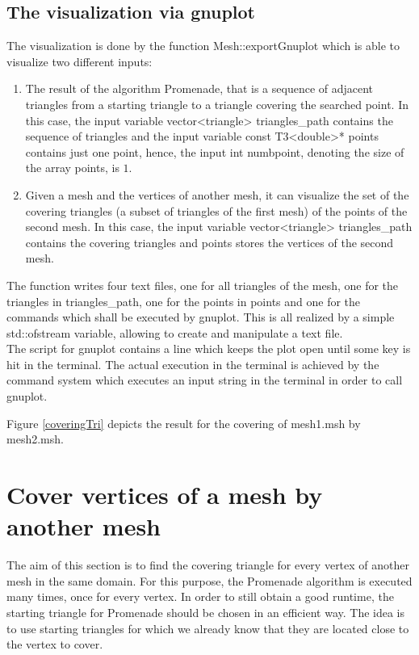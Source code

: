 \documentclass[10pt]{article}
\begin{document}
\subsection{The visualization via gnuplot} \label{visualization}
	The visualization is done by the function {\ttfamily Mesh::exportGnuplot} which is able to visualize two different inputs: 
	\begin{enumerate}
		\item 
		The result of the algorithm Promenade, that is a sequence of adjacent triangles from a starting triangle to a triangle covering the searched point. 
		In this case, the input variable {\ttfamily vector<triangle> triangles\_path} contains the sequence of triangles and the input variable {\ttfamily const T3<double>* points} contains just one point, hence, the input {\ttfamily int numbpoint}, denoting the size of the array {\ttfamily points}, is $ 1 $. 
		\item 
		Given a mesh and the vertices of another mesh, it can visualize the set of the covering triangles (a subset of triangles of the first mesh) of the points of the second mesh. 
		In this case, the input variable {\ttfamily vector<triangle> triangles\_path} contains the covering triangles and {\ttfamily points} stores the vertices of the second mesh. 
	\end{enumerate}
The function writes four text files, one for all triangles of the mesh, one for the triangles in {\ttfamily triangles\_path}, one for the points in {\ttfamily points} and one for the commands which shall be executed by {\ttfamily gnuplot}. This is all realized by a simple {\ttfamily std::ofstream} variable, allowing to create and manipulate a text file. \\
The script for {\ttfamily gnuplot} contains a line which keeps the plot open until some key is hit in the terminal. 
The actual execution in the terminal is achieved by the command {\ttfamily system} which executes an input string in the terminal in order to call {\ttfamily gnuplot}.

Figure \ref{coveringTri} depicts the result for the covering of mesh1.msh by mesh2.msh.
	
\section{Cover vertices of a mesh by another mesh}

The aim of this section is to find the covering triangle for every vertex of another mesh in the same domain. For this purpose, the Promenade algorithm is executed many times, once for every vertex. In order to still obtain a good runtime, the starting triangle for {\ttfamily Promenade} should be chosen in an efficient way. The idea is to use starting triangles for which we already know that they are located close to the vertex to cover.
\end{document}

